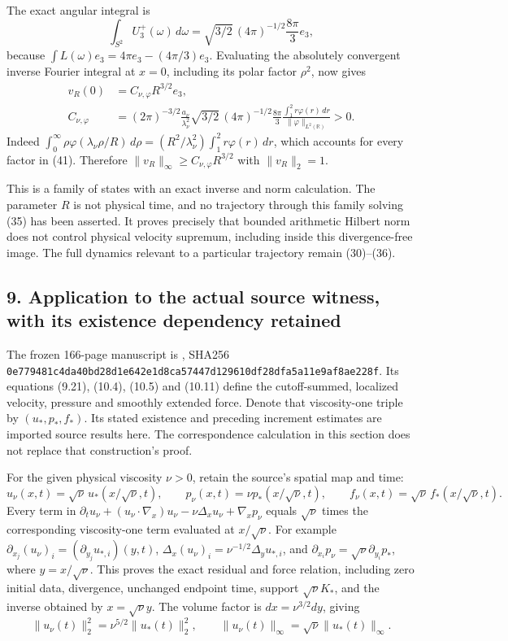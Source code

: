 The exact angular integral is \[
\int_{S^2}U_3^+(\omega)\,d\omega
=\sqrt{3/2}\,(4\pi)^{-1/2}\frac{8\pi}{3}e_3,
\tag{40}
\] because \(\int L(\omega)e_3=4\pi e_3-(4\pi/3)e_3\). Evaluating the absolutely convergent inverse Fourier integral at \(x=0\), including its polar factor \(\rho^2\), now gives \[
\begin{aligned}
v_R(0)&=C_{\nu,\varphi}R^{3/2}e_3,\\
C_{\nu,\varphi}
&=(2\pi)^{-3/2}\frac{a_\nu}{\lambda_\nu^2}
\sqrt{3/2}\,(4\pi)^{-1/2}\frac{8\pi}{3}
\frac{\int_1^2r\varphi(r)\,dr}{\|\varphi\|_{L^2(\mathbb R)}}>0.
\end{aligned}
\tag{41}
\] Indeed \(\int_0^\infty\rho\varphi(\lambda_\nu\rho/R)\,d\rho
=(R^2/\lambda_\nu^2)\int_1^2r\varphi(r)\,dr\), which accounts for every factor in (41). Therefore \(\|v_R\|_\infty\ge C_{\nu,\varphi}R^{3/2}\) with \(\|v_R\|_2=1\).

This is a family of states with an exact inverse and norm calculation. The parameter \(R\) is not physical time, and no trajectory through this family solving (35) has been asserted. It proves precisely that bounded arithmetic Hilbert norm does not control physical velocity supremum, including inside this divergence-free image. The full dynamics relevant to a particular trajectory remain (30)--(36).

\subsection*{9. Application to the actual source witness, with its existence dependency retained}

The frozen 166-page manuscript is , SHA256 \texttt{0e779481\allowbreak{}c4da40bd\allowbreak{}28d1e642\allowbreak{}e1d8ca57\allowbreak{}447d1296\allowbreak{}10df28df\allowbreak{}a5a11e9a\allowbreak{}f8ae228f}. Its equations (9.21), (10.4), (10.5) and (10.11) define the cutoff-summed, localized velocity, pressure and smoothly extended force. Denote that viscosity-one triple by \((u_*,p_*,f_*)\). Its stated existence and preceding increment estimates are imported source results here. The correspondence calculation in this section does not replace that construction's proof.

For the given physical viscosity \(\nu>0\), retain the source's spatial map and time: \[
u_\nu(x,t)=\sqrt\nu\,u_*(x/\sqrt\nu,t),\qquad
p_\nu(x,t)=\nu p_*(x/\sqrt\nu,t),\qquad
f_\nu(x,t)=\sqrt\nu\,f_*(x/\sqrt\nu,t).
\tag{42}
\] Every term in \(\partial_tu_\nu+(u_\nu\cdot\nabla_x)u_\nu-\nu\Delta_xu_\nu+\nabla_xp_\nu\) equals \(\sqrt\nu\) times the corresponding viscosity-one term evaluated at \(x/\sqrt\nu\). For example \(\partial_{x_j}(u_\nu)_i=(\partial_{y_j}u_{*,i})(y,t)\), \(\Delta_x(u_\nu)_i=\nu^{-1/2}\Delta_yu_{*,i}\), and \(\partial_{x_i}p_\nu=\sqrt\nu\partial_{y_i}p_*\), where \(y=x/\sqrt\nu\). This proves the exact residual and force relation, including zero initial data, divergence, unchanged endpoint time, support \(\sqrt\nu K_*\), and the inverse obtained by \(x=\sqrt\nu y\). The volume factor is \(dx=\nu^{3/2}dy\), giving \[
\|u_\nu(t)\|_2^2=\nu^{5/2}\|u_*(t)\|_2^2,
\qquad \|u_\nu(t)\|_\infty=\sqrt\nu\|u_*(t)\|_\infty.
\tag{43}
\]

